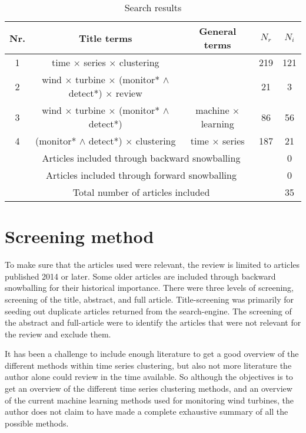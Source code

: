 \begin{table}[h]
    \centering
    \begin{tabular}{ |c|c|c|c|c| } 
    \hline
    Nr. & Title terms & General terms & $N_r$ & $N_i$ \\
    \hline
    \hline
    1 & time $\times$ series $\times$ clustering &  & 219 & 121 \\ 
    \hline
    2 & wind $\times$ turbine $\times$ (monitor* $\wedge{}$ detect*) $\times$ review &  & 21 & 3 \\
    \hline
    3 & wind $\times$ turbine $\times$ (monitor* $\wedge{}$ detect*) & machine $\times$ learning & 86 & 56 \\ 
    \hline
    4 & (monitor* $\wedge{}$ detect*) $\times$ clustering & time $\times$ series & 187 & 21 \\
    \hline
    \multicolumn{4}{|c|}{Articles included through backward snowballing} & 0 \\
    \hline
    \multicolumn{4}{|c|}{Articles included through forward snowballing} & 0 \\
    \hline
    \hline
    \multicolumn{4}{|c|}{Total number of articles included} & 35 \\
    \hline
    \end{tabular}
    \caption{Search results}
    \label{tab:search_results}
\end{table}

\section{Screening method}
To make sure that the articles used were relevant, the review is limited to articles published 2014 or later. Some older articles are included through backward snowballing for their historical importance. There were three levels of screening, screening of the title, abstract, and full article. Title-screening was primarily for seeding out duplicate articles returned from the search-engine. The screening of the abstract and full-article were to identify the articles that were not relevant for the review and exclude them. \bigskip

It has been a challenge to include enough literature to get a good overview of the different methods within time series clustering, but also not more literature the author alone could review in the time available. So although the objectives is to get an overview of the different time series clustering methods, and an overview of the current machine learning methods used for monitoring wind turbines, the author does not claim to have made a complete exhaustive summary of all the possible methods. \bigskip

